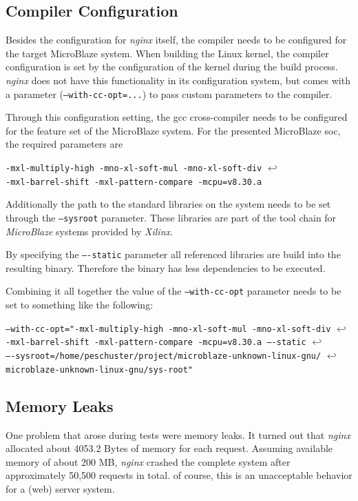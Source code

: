 \subsection{Compiler Configuration}

Besides the configuration for \textit{nginx} itself, the compiler needs to be configured for the target MicroBlaze system. When building the Linux kernel, the compiler configuration is set by the configuration of the kernel during the build process. \textit{nginx} does not have this functionality in its configuration system, but comes with a parameter (\texttt{--with-cc-opt=...}) to pass custom parameters to the compiler.

Through this configuration setting, the gcc cross-compiler needs to be configured for the feature set of the MicroBlaze system. For the presented MicroBlaze \gls{soc}, the required parameters are

\texttt{-mxl-multiply-high -mno-xl-soft-mul -mno-xl-soft-div} $\hookleftarrow$ \\
\texttt{-mxl-barrel-shift -mxl-pattern-compare -mcpu=v8.30.a}

Additionally the path to the standard libraries on the system needs to be set through the \texttt{--sysroot} parameter. These libraries are part of the tool chain for \textit{MicroBlaze} systems provided by \textit{Xilinx}. 

By specifying the \texttt{----static} parameter all referenced libraries are build into the resulting binary. Therefore the binary has less dependencies to be executed.

Combining it all together the value of the \texttt{--with-cc-opt} parameter needs to be set to something like the following: 

\texttt{--with-cc-opt="-mxl-multiply-high -mno-xl-soft-mul -mno-xl-soft-div} $ \hookleftarrow$ \\
\texttt{-mxl-barrel-shift -mxl-pattern-compare -mcpu=v8.30.a ----static} $ \hookleftarrow$ \\
\texttt{----sysroot=/home/peschuster/project/microblaze-unknown-linux-gnu/} $ \hookleftarrow$ \\
\texttt{microblaze-unknown-linux-gnu/sys-root"}

\subsection{Memory Leaks}

One problem that arose during tests were memory leaks. It turned out that \textit{nginx} allocated about 4053.2 Bytes of memory for each request. Assuming available memory of about 200 MB, \textit{nginx} crashed the complete system after approximately 50,500 requests in total. of course, this is an unacceptable behavior for a (web) server system.

